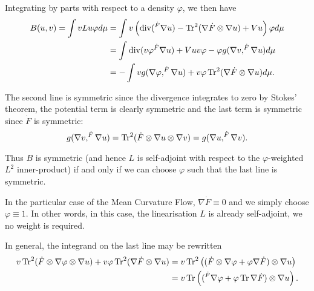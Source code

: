 \documentclass{amsart}
\begin{document}
Integrating by parts with respect to a density \(\varphi\), we then have
\begin{align*}
B(u, v) = \int v Lu \varphi d\mu &= \int v\left(\operatorname{div} (^{\dot{F}}\nabla u) - \operatorname{Tr}^2 (\nabla \dot{F} \otimes \nabla u) + V u\right) \varphi d\mu \\
&= \int \operatorname{div} (v\varphi ^{\dot{F}}\nabla u) + V u v \varphi - \varphi g(\nabla v, ^{\dot{F}}\nabla u) d\mu \\
&= - \int v g (\nabla \varphi, ^{\dot{F}}\nabla u) + v\varphi \operatorname{Tr}^2 (\nabla \dot{F} \otimes \nabla u) d\mu.
\end{align*}

The second line is symmetric since the divergence integrates to zero by Stokes' theorem, the potential term is clearly symmetric and the last term is symmetric since \(\dot{F}\) is symmetric:
\[
g(\nabla v, ^{\dot{F}}\nabla u) = \operatorname{Tr}^2(\dot{F} \otimes \nabla u \otimes \nabla v) = g(\nabla u, ^{\dot{F}}\nabla v).
\]

Thus \(B\) is symmetric (and hence \(L\) is self-adjoint with respect to the \(\varphi\)-weighted \(L^2\) inner-product) if and only if we can choose \(\varphi\) such that the last line is symmetric.

\begin{rem}
In the particular case of the Mean Curvature Flow, \(\nabla \dot{F} \equiv 0\) and we simply choose \(\varphi \equiv 1\). In other words, in this case, the linearisation \(L\) is already self-adjoint, we no weight is required.
\end{rem}

In general, the integrand on the last line may be rewritten
\begin{align*}
v \operatorname{Tr}^2(\dot{F} \otimes \nabla \varphi \otimes \nabla u) + v \varphi \operatorname{Tr}^2(\nabla \dot{F} \otimes \nabla u) &= v \operatorname{Tr}^2 \left((\dot{F} \otimes \nabla \varphi + \varphi \nabla \dot{F}) \otimes \nabla u\right) \\
&= v \operatorname{Tr}\left((^{\dot{F}} \nabla \varphi + \varphi \operatorname{Tr} \nabla \dot{F}) \otimes \nabla u\right).
\end{align*}
\end{document}

